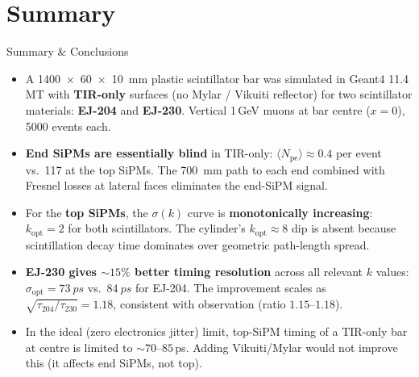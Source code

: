 \documentclass[aspectratio=169,10pt]{beamer}
\begin{document}
\section{Summary}

\begin{frame}{Summary \& Conclusions}

\begin{itemize}\setlength\itemsep{0.5em}

  \item[\textbf{1.}]
    A \SI{1400x60x10}{mm} plastic scintillator bar was simulated in Geant4 11.4 MT
    with \textbf{TIR-only} surfaces (no Mylar / Vikuiti reflector) for two
    scintillator materials: \textcolor{ej204col}{\textbf{EJ-204}} and
    \textcolor{ej230col}{\textbf{EJ-230}}.
    Vertical 1\,GeV muons at bar centre ($x=0$), 5000 events each.

  \item[\textbf{2.}]
    \textbf{End SiPMs are essentially blind} in TIR-only:
    $\langle N_\text{pe}\rangle \approx 0.4$ per event vs.\ 117 at the top SiPMs.
    The \SI{700}{mm} path to each end combined with Fresnel losses at lateral faces
    eliminates the end-SiPM signal.

  \item[\textbf{3.}]
    For the \textbf{top SiPMs}, the $\sigma(k)$ curve is \textbf{monotonically
    increasing}: $k_\text{opt}=2$ for both scintillators.
    The cylinder's $k_\text{opt}\approx8$ dip is absent because scintillation
    decay time dominates over geometric path-length spread.

  \item[\textbf{4.}]
    \textbf{\textcolor{ej230col}{EJ-230 gives $\sim\!15\%$ better timing resolution}}
    across all relevant $k$ values:
    $\sigma_\text{opt}=\SI{73}{ps}$ vs.\ $\SI{84}{ps}$ for EJ-204.
    The improvement scales as $\sqrt{\tau_{204}/\tau_{230}} = 1.18$,
    consistent with observation (ratio $1.15$--$1.18$).

  \item[\textbf{5.}]
    In the ideal (zero electronics jitter) limit, top-SiPM timing of a
    TIR-only bar at centre is limited to $\sim\!70$--$85\,$ps.
    Adding Vikuiti/Mylar would not improve this (it affects end SiPMs, not top).

\end{itemize}

\end{frame}
\end{document}
